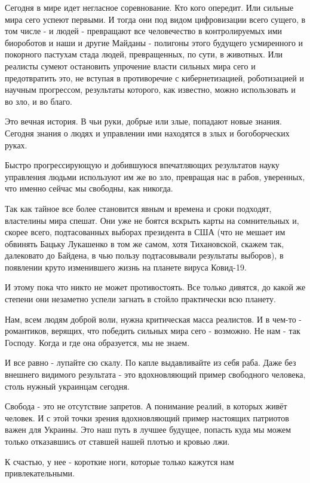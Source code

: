 Сегодня в мире идет негласное соревнование. Кто кого опередит. Или сильные мира
сего успеют первыми. И тогда они под видом цифровизации всего сущего, в том
числе - и людей - превращают все человечество в контролируемых ими биороботов и
наши и другие Майданы - полигоны этого  будущего усмиренного и покорного
пастухам стада людей, превращенных, по сути, в животных. Или реалисты сумеют
остановить упрочение власти сильных мира сего и предотвратить это, не вступая в
противоречие с кибернетизацией, роботизацией и научным прогрессом, результаты
которого, как известно, можно использовать и во зло, и во благо.

Это вечная история. В чьи руки, добрые или злые, попадают новые знания. Сегодня
знания о людях и управлении ими находятся в злых и богоборческих руках.

Быстро прогрессирующую и добившуюся впечатляющих результатов науку управления
людьми используют им же во зло, превращая нас в рабов, уверенных, что именно
сейчас мы свободны, как никогда.

Так как тайное все более становится явным и времена и сроки подходят,
властелины мира спешат. Они уже не боятся вскрыть карты на сомнительных и,
скорее всего, подтасованных выборах президента в США (что не мешает им обвинять
Бацьку Лукашенко в том же самом, хотя Тихановской, скажем так, далековато до
Байдена, в чью пользу подтасовывали результаты выборов), в появлении круто
изменившего жизнь на планете вируса Ковид-19.

И этому пока что никто не может противостоять. Все только дивятся, до какой же
степени они незаметно успели загнать в стойло практически всю планету.

Нам, всем людям доброй воли, нужна критическая масса реалистов. И в чем-то -
романтиков, верящих, что победить сильных мира сего - возможно. Не нам - так
Господу. Когда и где она образуется, мы не знаем.

И все равно - лупайте сю скалу. По капле выдавливайте из себя раба. Даже без
внешнего видимого результата - это вдохновляющий пример свободного человека,
столь нужный украинцам сегодня.

Свобода - это не отсутствие запретов. А понимание реалий, в которых живёт
человек. И с этой точки зрения вдохновляющий пример настоящих патриотов важен
для Украины. Это наш путь в лучшее будущее, попасть куда мы можем только
отказавшись от ставшей нашей плотью и кровью лжи.

К счастью, у нее - короткие ноги, которые только кажутся нам привлекательными.

